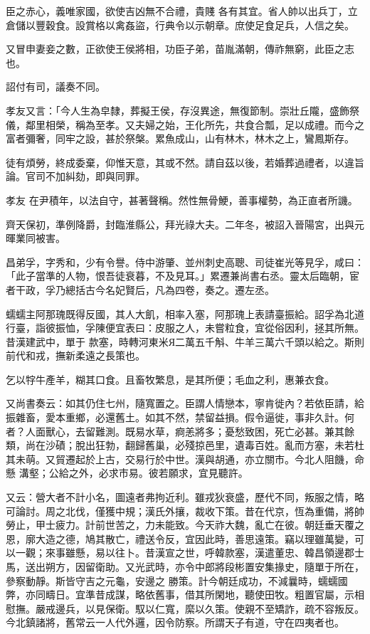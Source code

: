 \begin{pinyinscope}
 臣之赤心，義唯家國，欲使吉凶無不合禮，貴賤
 各有其宜。省人帥以出兵丁，立倉儲以豐穀食。設賞格以禽姦盜，行典令以示朝章。庶使足食足兵，人信之矣。



 又冒申妻妾之數，正欲使王侯將相，功臣子弟，苗胤滿朝，傳祚無窮，此臣之志也。



 詔付有司，議奏不同。



 孝友又言：「今人生為皁隸，葬擬王侯，存沒異途，無復節制。崇壯丘隴，盛飾祭儀，鄰里相榮，稱為至孝。又夫婦之始，王化所先，共食合瓢，足以成禮。而今之富者彌奢，同牢之設，甚於祭槃。累魚成山，山有林木，林木之上，鸞鳳斯存。



 徒有煩勞，終成委棄，仰惟天意，其或不然。請自茲以後，若婚葬過禮者，以違旨論。官司不加糾劾，即與同罪。



 孝友
 在尹積年，以法自守，甚著聲稱。然性無骨鯁，善事權勢，為正直者所譏。



 齊天保初，準例降爵，封臨淮縣公，拜光祿大夫。二年冬，被詔入晉陽宮，出與元暉業同被害。



 昌弟孚，字秀和，少有令譽。侍中游肇、並州刺史高聰、司徒崔光等見孚，咸曰：「此子當準的人物，恨吾徒衰暮，不及見耳。」累遷兼尚書右丞。靈太后臨朝，宦者干政，孚乃總括古今名妃賢后，凡為四卷，奏之。遷左丞。



 蠕蠕主阿那瑰既得反國，其人大飢，相率入塞，阿那瑰上表請臺振給。詔孚為北道行臺，詣彼振恤，孚陳便宜表曰：皮服之人，未嘗粒食，宜從俗因利，拯其所無。昔漢建武中，單于
 款塞，時轉河東米Я二萬五千斛、牛羊三萬六千頭以給之。斯則前代和戎，撫新柔遠之長策也。



 乞以牸牛產羊，糊其口食。且畜牧繁息，是其所便；毛血之利，惠兼衣食。



 又尚書奏云：如其仍住七州，隨寬置之。臣謂人情戀本，寧肯徙內？若依臣請，給振雜畜，愛本重鄉，必還舊土。如其不然，禁留益損。假令逼徙，事非久計。何者？人面獸心，去留難測。既易水草，痾恙將多；憂愁致困，死亡必甚。兼其餘類，尚在沙磧；脫出狂勃，翻歸舊巢，必殘掠邑里，遺毒百姓。亂而方塞，未若杜其未萌。又貿遷起於上古，交易行於中世。漢與胡通，亦立關市。今北人阻饑，命懸
 溝壑；公給之外，必求市易。彼若願求，宜見聽許。



 又云：營大者不計小名，圖遠者弗拘近利。雖戎狄衰盛，歷代不同，叛服之情，略可論討。周之北伐，僅獲中規；漢氏外攘，裁收下策。昔在代京，恆為重備，將帥勞止，甲士疲力。計前世苦之，力未能致。今天祚大魏，亂亡在彼。朝廷垂天覆之恩，廓大造之德，鳩其散亡，禮送令反，宜因此時，善思遠策。竊以理雖萬變，可以一觀；來事雖懸，易以往卜。昔漢宣之世，呼韓款塞，漢遣董忠、韓昌領邊郡士馬，送出朔方，因留衛助。又光武時，亦令中郎將段彬置安集掾史，隨單于所在，參察動靜。斯皆守吉之元龜，安邊之
 勝策。計今朝廷成功，不減曩時，蠕蠕國弊，亦同疇日。宜準昔成謀，略依舊事，借其所閑地，聽使田牧。粗置官屬，示相慰撫。嚴戒邊兵，以見保衛。馭以仁寬，縻以久策。使親不至矯詐，疏不容叛反。今北鎮諸將，舊常云一人代外邏，因令防察。所謂天子有道，守在四夷者也。




\end{pinyinscope}
